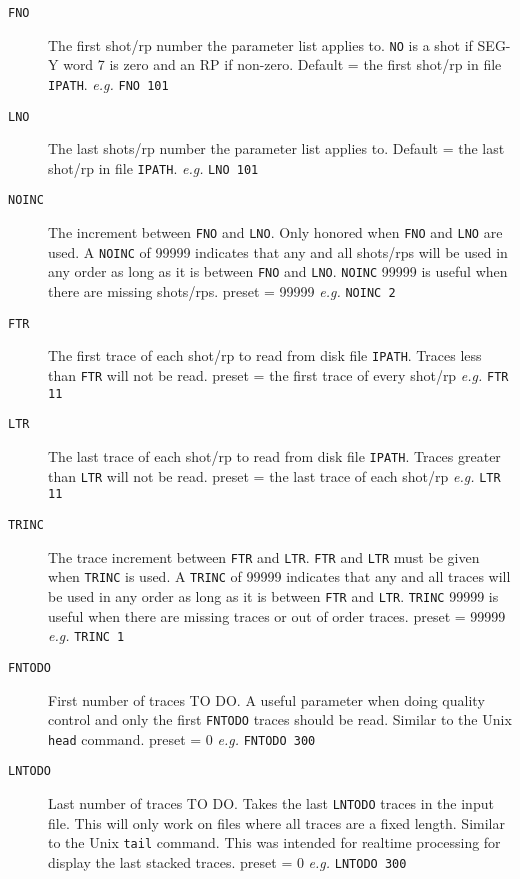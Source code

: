 \begin{description}
\item[\texttt{FNO}] The first \gls{shot}/\gls{rp} number the parameter list applies to.  \texttt{NO} is a \gls{shot} if SEG-Y word 7 is zero and an RP if non-zero.  Default = the first \gls{shot}/\gls{rp} in file \texttt{IPATH}.  \textit{e.g.}   \texttt{FNO 101}

\item[\texttt{LNO}] The last \glspl{shot}/\gls{rp} number the parameter list applies to.  Default = the last \gls{shot}/\gls{rp} in file \texttt{IPATH}.   \textit{e.g.} \texttt{LNO 101}

\item[\texttt{NOINC}] The increment between \texttt{FNO} and \texttt{LNO}.  Only honored when \texttt{FNO} and \texttt{LNO} are used.  A \texttt{NOINC} of 99999 indicates that any and all \glspl{shot}/\glspl{rp} will be used in any order as long as it is between \texttt{FNO} and \texttt{LNO}.  \texttt{NOINC} 99999 is useful when there are missing \glspl{shot}/\glspl{rp}.  \Gls{preset} = 99999 \textit{e.g.} \texttt{NOINC 2}

\item[\texttt{FTR}] The first trace of each \gls{shot}/\gls{rp} to read from disk file \texttt{IPATH}.  Traces less than \texttt{FTR} will not be read.  \Gls{preset} = the first trace of every \gls{shot}/\gls{rp}   \textit{e.g.}  \texttt{FTR 11}

\item[\texttt{LTR}] The last trace of each \gls{shot}/\gls{rp} to read from disk file \texttt{IPATH}.  Traces greater than \texttt{LTR} will not be read.  \Gls{preset} = the last trace of each \gls{shot}/\gls{rp}    \textit{e.g.} \texttt{LTR 11}

\item[\texttt{TRINC}] The trace increment between \texttt{FTR} and \texttt{LTR}.  \texttt{FTR} and \texttt{LTR} must be given when \texttt{TRINC} is used.  A \texttt{TRINC} of 99999 indicates that any and all traces will be used in any order as long as it is between \texttt{FTR} and \texttt{LTR}.  \texttt{TRINC} 99999 is useful when there are missing traces or out of order traces.  \Gls{preset} = 99999 \textit{e.g.} \texttt{TRINC 1}

\item[\texttt{FNTODO}] First number of traces TO DO.  A useful parameter when doing quality control and only the first \texttt{FNTODO} traces should be read.  Similar to the Unix \texttt{head} command.  \Gls{preset} = 0    \textit{e.g.} \texttt{FNTODO 300}

\item[\texttt{LNTODO}] Last number of traces TO DO.  Takes the last \texttt{LNTODO} traces in the input file.  This will only work on files where all traces are a fixed length.  Similar to the Unix \texttt{tail} command.  This was intended for realtime processing for display the last stacked traces.  \Gls{preset} = 0    \textit{e.g.} \texttt{LNTODO 300}
\end{description}


